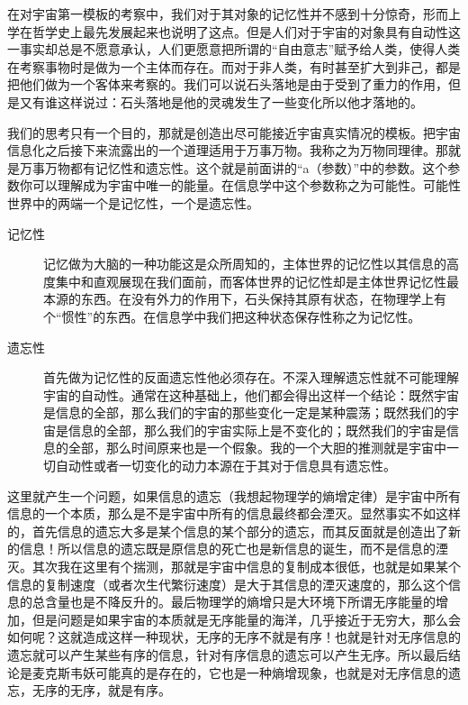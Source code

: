 \documentclass[11pt,oneside]{article}
\begin{document}
在对宇宙第一模板的考察中，我们对于其对象的记忆性并不感到十分惊奇，形而上学在哲学史上最先发展起来也说明了这点。但是人们对于宇宙的对象具有自动性这一事实却总是不愿意承认，人们更愿意把所谓的“自由意志”赋予给人类，使得人类在考察事物时是做为一个主体而存在。而对于非人类，有时甚至扩大到非己，都是把他们做为一个客体来考察的。我们可以说石头落地是由于受到了重力的作用，但是又有谁这样说过：石头落地是他的灵魂发生了一些变化所以他才落地的。

我们的思考只有一个目的，那就是创造出尽可能接近宇宙真实情况的模板。把宇宙信息化之后接下来流露出的一个道理适用于万事万物。我称之为万物同理律。那就是万事万物都有记忆性和遗忘性。这个就是前面讲的“a（参数）”中的参数。这个参数你可以理解成为宇宙中唯一的能量。在信息学中这个参数称之为可能性。可能性世界中的两端一个是记忆性，一个是遗忘性。

\begin{description}
\item[{记忆性}] 记忆做为大脑的一种功能这是众所周知的，主体世界的记忆性以其信息的高度集中和直观展现在我们面前，而客体世界的记忆性却是主体世界记忆性最本源的东西。在没有外力的作用下，石头保持其原有状态，在物理学上有个“惯性”的东西。在信息学中我们把这种状态保存性称之为记忆性。

\item[{遗忘性}] 首先做为记忆性的反面遗忘性他必须存在。不深入理解遗忘性就不可能理解宇宙的自动性。通常在这种基础上，他们都会得出这样一个结论：既然宇宙是信息的全部，那么我们的宇宙的那些变化一定是某种震荡；既然我们的宇宙是信息的全部，那么我们的宇宙实际上是不变化的；既然我们的宇宙是信息的全部，那么时间原来也是一个假象。我的一个大胆的推测就是宇宙中一切自动性或者一切变化的动力本源在于其对于信息具有遗忘性。
\end{description}

这里就产生一个问题，如果信息的遗忘（我想起物理学的熵增定律）是宇宙中所有信息的一个本质，那么是不是宇宙中所有的信息最终都会湮灭。显然事实不如这样的，首先信息的遗忘大多是某个信息的某个部分的遗忘，而其反面就是创造出了新的信息！所以信息的遗忘既是原信息的死亡也是新信息的诞生，而不是信息的湮灭。其次我在这里有个揣测，那就是宇宙中信息的复制成本很低，也就是如果某个信息的复制速度（或者次生代繁衍速度）是大于其信息的湮灭速度的，那么这个信息的总含量也是不降反升的。最后物理学的熵增只是大环境下所谓无序能量的增加，但是问题是如果宇宙的本质就是无序能量的海洋，几乎接近于无穷大，那么会如何呢？这就造成这样一种现状，无序的无序不就是有序！也就是针对无序信息的遗忘就可以产生某些有序的信息，针对有序信息的遗忘可以产生无序。所以最后结论是麦克斯韦妖可能真的是存在的，它也是一种熵增现象，也就是对无序信息的遗忘，无序的无序，就是有序。
\end{document}
